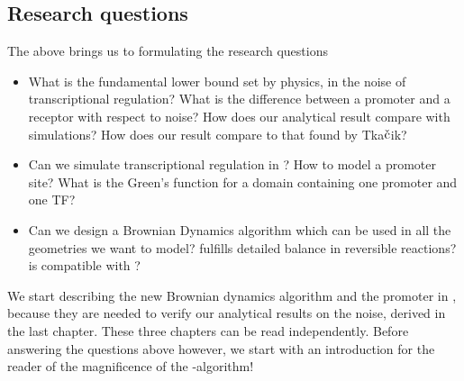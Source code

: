\subsection{Research questions}
The above brings us to formulating the research questions
\begin{itemize}
 \item What is the fundamental lower bound set by physics, in the noise of transcriptional regulation?
 \subitem What is the difference between a promoter and a receptor with respect to noise?
 \subitem How does our analytical result compare with simulations? 
 \subitem How does our result compare to that found by Tka$\check{\rm c}$ik?

 \item Can we simulate transcriptional regulation in \GFRD ?
 \subitem How to model a promoter site?
 \subitem What is the Green's function for a domain containing one promoter and one TF?
 
 \item Can we design a Brownian Dynamics algorithm which
 \subitem can be used in all the geometries we want to model?
 \subitem fulfills detailed balance in reversible reactions?
 \subitem is compatible with \GFRD ?
\end{itemize}
We start describing the new Brownian dynamics algorithm and the promoter in \GFRD, because they are needed to verify our analytical results on the noise, derived in the last chapter. These three chapters can be read independently. Before answering the questions above however, we start with an introduction for the reader of the magnificence of the \GFRD -algorithm!










